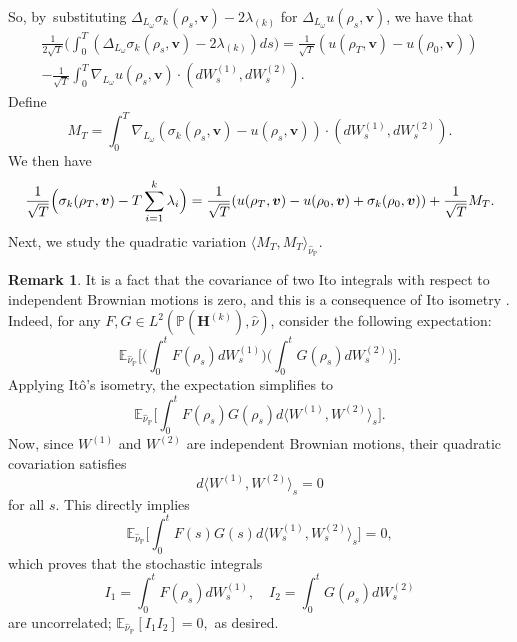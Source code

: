 \documentclass[10pt]{amsart}
\theoremstyle{plain}
\theoremstyle{definition}
\newtheorem{rem}[thm]{Remark}
\numberwithin{equation}{subsection}
\newcommand\bE{\mathbb{E}}
\newcommand\bP{\mathbb{P}}
\let\gradient\nabla
\let\laplacian\Delta
\newcommand{\bfH}{\boldsymbol{H}}
\newcommand{\bfv}{\boldsymbol{v}}
\begin{document}
So, by~substituting $\laplacian_{L_\omega} \sigma_k(\rho_s,\bfv)-2\lambda_{(k)}$ for $\laplacian_{L_\omega} u(\rho_s, \bfv)$, we have that\vspace*{-5pt}
\begin{multline*}
\frac{1}{2\sqrt{T}}\biggl(\int_0^T (\laplacian_{L_\omega} \sigma_k(\rho_s,\bfv)-2\lambda_{(k)})ds \biggr) =\frac{1}{\sqrt{T}}(u(\rho_T, \bfv)-u(\rho_0, \bfv)) \\[-5pt]
- \frac{1}{\sqrt{T}}\int_0^T \gradient_{L_\omega} u(\rho_s, \bfv) \cdot (dW^{(1)}_s,dW^{(2)}_s). 
\end{multline*}
Define\vspace*{-3pt}
\begin{equation}
M_T = \int_0^T \gradient_{L_\omega} (\sigma_k(\rho_s,\bfv)-u(\rho_s,\bfv)) \cdot (dW^{(1)}_s,dW^{(2)}_s).\label{itointegralformula}
\end{equation}
We then have\vspace*{-3pt}
\begin{equation}
\frac{1}{\sqrt{T}} \Bigl(\sigma_k(\rho_T,\bfv) - T\sum_{i=1}^k\lambda_i \Bigr) = \frac{1}{\sqrt{T}}(u(\rho_T,\bfv)-u(\rho_0,\bfv) +\sigma_k(\rho_0,\bfv)) + \frac{1}{\sqrt{T}}M_T. \label{M_T_identity}
\end{equation}
Next, we study the quadratic variation $\langle M_T, M_T\rangle_{\hat{\nu}_\bP}$.
\begin{rem} It is a fact that the covariance of two Ito integrals with respect to independent Brownian motions is zero, and this is a consequence of Ito isometry \cite[Th.\,IV.2.2]{RY}. Indeed, for any \(F, G \in L^2(\bP(\bfH^{(k)}), \hat\nu)\), consider the following expectation:\vspace*{-3pt}
\[\textstyle
\bE_{{\hat{\nu}_\bP}} \bigl[ \bigl(\int_0^t F(\rho_s) dW^{(1)}_s \bigr) \bigl(\int_0^t G(\rho_s) dW^{(2)}_s \bigr) \bigr].
\]
Applying Itô’s isometry, the expectation simplifies to
\[\textstyle
\bE_{{\hat{\nu}_\bP}} \bigl[\int_0^t F(\rho_s) G(\rho_s) d\langle W^{(1)}, W^{(2)} \rangle_s \bigr].
\]
Now, since \(W^{(1)} \) and \(W^{(2)} \) are independent Brownian motions, their quadratic covariation satisfies\vspace*{-3pt}
\[
d\langle W^{(1)}, W^{(2)} \rangle_s = 0
\]
for all \(s \). This directly implies
\[\textstyle
\bE_{{\hat{\nu}_\bP}}\bigl[\int_0^t F(s) G(s) d\langle W^{(1)}_s, W^{(2)}_s \rangle_s \bigl] = 0,
\]
which proves that the stochastic integrals
\[
I_1 = \int_0^t F(\rho_s) dW^{(1)}_s, \quad I_2 = \int_0^t G(\rho_s) dW^{(2)}_s
\]
are uncorrelated; \ie \(\bE_{{\hat{\nu}_\bP}}[I_1 I_2] = 0,\) as desired.\end{rem}
\end{document}
